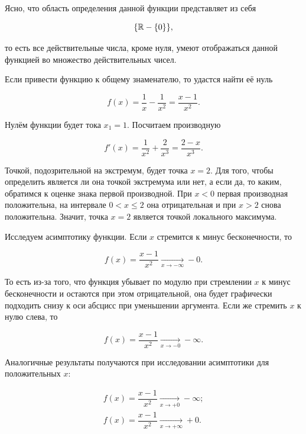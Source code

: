 \documentclass[12pt]{article}
\begin{document}
Ясно, что область определения данной функции представляет из себя

\begin{equation}
	\qty{\mathbb{R} - \qty{0}},
\end{equation}

то есть все действительные числа, кроме нуля, умеют отображаться данной функцией во множество действительных чисел.

\par Если привести функцию к общему знаменателю, то удастся найти её нуль

\begin{equation}
	f(x) = \dfrac{1}{x} - \dfrac{1}{x^2} = \dfrac{x - 1}{x^2}.
\end{equation}

Нулём функции будет тока $x_1 = 1$. Посчитаем производную

\begin{equation}
	f'(x) = \dfrac{1}{x^2} + \dfrac{2}{x^3} = \dfrac{2-x}{x^3}.
\end{equation}

Точкой, подозрительной на экстремум, будет точка $x=2$. Для того, чтобы определить является ли она точкой экстремума или нет, а если да, то каким, обратимся к оценке знака первой производной. При $x<0$ первая производная положительна, на интервале $ 0 < x \le 2$ она отрицательная и при $x>2$ снова положительна. Значит, точка $x=2$ является точкой локального максимума.

\par Исследуем асимптотику функции. Если $x$ стремится к минус бесконечности, то 

\begin{equation}
	f(x) = \dfrac{x - 1}{x^2} \underset{x\rightarrow-\infty}{\longrightarrow} -0.
\end{equation}

То есть из\--за того, что функция убывает по модулю при стремлении $x$ к минус бесконечности и остаются при этом отрицательной, она будет графически подходить снизу к оси абсцисс при уменьшении аргумента. Если же стремить $x$ к нулю слева, то

\begin{equation}
	f(x) = \dfrac{x - 1}{x^2} \underset{x\rightarrow-0}{\longrightarrow} -\infty.
\end{equation}

Аналогичные результаты получаются при исследовании асимптотики для положительных $x$:

\begin{gather} 
f(x) = \dfrac{x - 1}{x^2} \underset{x\rightarrow+0}{\longrightarrow} -\infty; \\ 
f(x) = \dfrac{x - 1}{x^2} \underset{x\rightarrow +\infty}{\longrightarrow} +0.
\end{gather}
\end{document}
